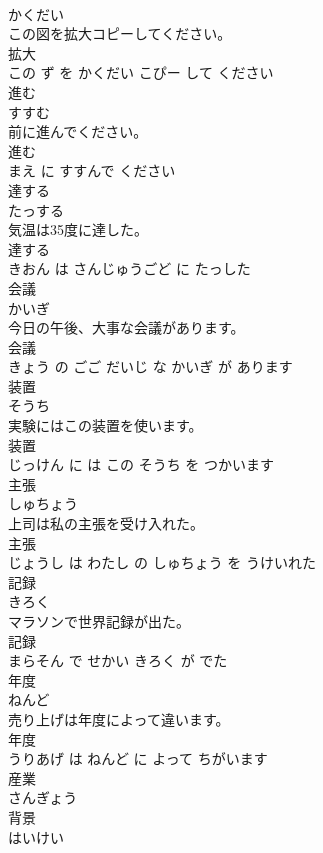 \documentclass[8pt]{extreport}
\begin{document}
\begin{CJK}{UTF8}{min}
\\	かくだい			
\\	この図を拡大コピーしてください。	
\\	拡大 
\\	この ず を かくだい こぴー して ください			
\\	進む	
\\	すすむ			
\\	前に進んでください。	
\\	進む 
\\	まえ に すすんで ください			
\\	達する	
\\	たっする			
\\	気温は35度に達した。	
\\	達する 
\\	きおん は さんじゅうごど に たっした			
\\	会議	
\\	かいぎ			
\\	今日の午後、大事な会議があります。	
\\	会議 
\\	きょう の ごご だいじ な かいぎ が あります			
\\	装置	
\\	そうち			
\\	実験にはこの装置を使います。	
\\	装置 
\\	じっけん に は この そうち を つかいます			
\\	主張	
\\	しゅちょう			
\\	上司は私の主張を受け入れた。	
\\	主張 
\\	じょうし は わたし の しゅちょう を うけいれた			
\\	記録	
\\	きろく			
\\	マラソンで世界記録が出た。	
\\	記録 
\\	まらそん で せかい きろく が でた			
\\	年度	
\\	ねんど			
\\	売り上げは年度によって違います。	
\\	年度 
\\	うりあげ は ねんど に よって ちがいます			
\\	産業	
\\	さんぎょう			
\\	背景	
\\	はいけい			

\end{CJK}
\end{document}
